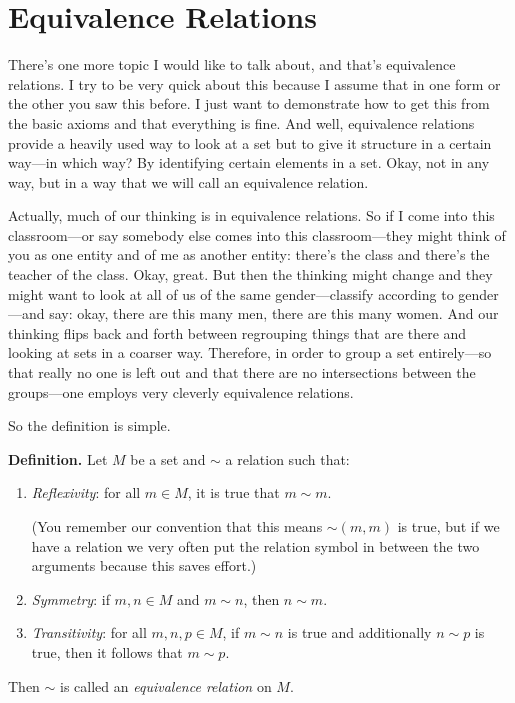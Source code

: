\section{Equivalence Relations}

There's one more topic I would like to talk about, and that's equivalence relations. I try to be very quick about this because I assume that in one form or the other you saw this before. I just want to demonstrate how to get this from the basic axioms and that everything is fine. And well, equivalence relations provide a heavily used way to look at a set but to give it structure in a certain way---in which way? By identifying certain elements in a set. Okay, not in any way, but in a way that we will call an equivalence relation.

Actually, much of our thinking is in equivalence relations. So if I come into this classroom---or say somebody else comes into this classroom---they might think of you as one entity and of me as another entity: there's the class and there's the teacher of the class. Okay, great. But then the thinking might change and they might want to look at all of us of the same gender---classify according to gender---and say: okay, there are this many men, there are this many women. And our thinking flips back and forth between regrouping things that are there and looking at sets in a coarser way. Therefore, in order to group a set entirely---so that really no one is left out and that there are no intersections between the groups---one employs very cleverly equivalence relations.

So the definition is simple.

\textbf{Definition.} Let $M$ be a set and $\sim$ a relation such that:
\begin{enumerate}
\item \emph{Reflexivity}: for all $m \in M$, it is true that $m \sim m$.

(You remember our convention that this means ${\sim}(m, m)$ is true, but if we have a relation we very often put the relation symbol in between the two arguments because this saves effort.)

\item \emph{Symmetry}: if $m, n \in M$ and $m \sim n$, then $n \sim m$.

\item \emph{Transitivity}: for all $m, n, p \in M$, if $m \sim n$ is true and additionally $n \sim p$ is true, then it follows that $m \sim p$.
\end{enumerate}
Then $\sim$ is called an \emph{equivalence relation} on $M$.

